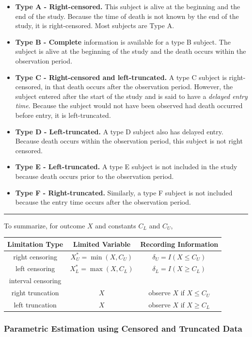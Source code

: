 \documentclass[]{book}
\providecommand{\tightlist}{%
  \setlength{\itemsep}{0pt}\setlength{\parskip}{0pt}}
\theoremstyle{definition}
\theoremstyle{definition}
\theoremstyle{definition}
\theoremstyle{remark}
\begin{document}
\begin{itemize}
\tightlist
\item
  \textbf{Type A - Right-censored.} This subject is alive at the
  beginning and the end of the study. Because the time of death is not
  known by the end of the study, it is right-censored. Most subjects are
  Type A.
\item
  \textbf{Type B - Complete} information is available for a type B
  subject. The subject is alive at the beginning of the study and the
  death occurs within the observation period.
\item
  \textbf{Type C - Right-censored and left-truncated.} A type C subject
  is right-censored, in that death occurs after the observation period.
  However, the subject entered after the start of the study and is said
  to have a \emph{delayed entry time}. Because the subject would not
  have been observed had death occurred before entry, it is
  left-truncated.
\item
  \textbf{Type D - Left-truncated.} A type D subject also has delayed
  entry. Because death occurs within the observation period, this
  subject is not right censored.
\item
  \textbf{Type E - Left-truncated.} A type E subject is not included in
  the study because death occurs prior to the observation period.
\item
  \textbf{Type F - Right-truncated.} Similarly, a type F subject is not
  included because the entry time occurs after the observation period.
\end{itemize}

\begin{center}\rule{0.5\linewidth}{\linethickness}\end{center}

To summarize, for outcome \(X\) and constants \(C_L\) and \(C_U\),

\begin{longtable}[]{@{}ccc@{}}
\toprule
Limitation Type & Limited Variable & Recording
Information\tabularnewline
\midrule
\endhead
right censoring & \(X_U^{\ast}= \min(X, C_U)\) &
\(\delta_U= I(X \leq C_U)\)\tabularnewline
left censoring & \(X_L^{\ast}= \max(X, C_L)\) &
\(\delta_L= I(X \geq C_L)\)\tabularnewline
interval censoring & &\tabularnewline
right truncation & \(X\) & observe \(X\) if
\(X \leq C_U\)\tabularnewline
left truncation & \(X\) & observe \(X\) if \(X \geq C_L\)\tabularnewline
\bottomrule
\end{longtable}

\subsubsection{Parametric Estimation using Censored and Truncated
Data}\label{parametric-estimation-using-censored-and-truncated-data}
\end{document}
